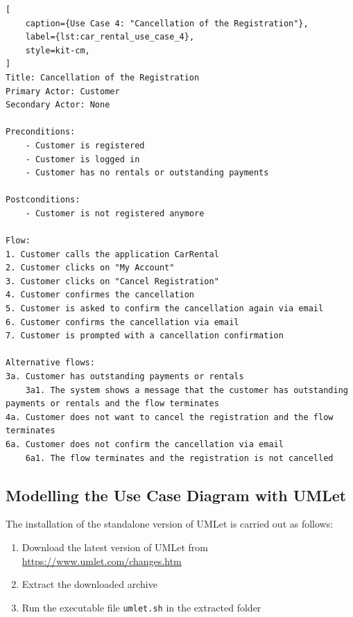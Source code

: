 \begin{lstlisting}[
    caption={Use Case 4: "Cancellation of the Registration"},
    label={lst:car_rental_use_case_4},
    style=kit-cm,
]
Title: Cancellation of the Registration
Primary Actor: Customer
Secondary Actor: None

Preconditions:
    - Customer is registered
    - Customer is logged in
    - Customer has no rentals or outstanding payments

Postconditions:
    - Customer is not registered anymore

Flow:
1. Customer calls the application CarRental
2. Customer clicks on "My Account"
3. Customer clicks on "Cancel Registration"
4. Customer confirmes the cancellation
5. Customer is asked to confirm the cancellation again via email
6. Customer confirms the cancellation via email
7. Customer is prompted with a cancellation confirmation

Alternative flows:
3a. Customer has outstanding payments or rentals
    3a1. The system shows a message that the customer has outstanding payments or rentals and the flow terminates
4a. Customer does not want to cancel the registration and the flow terminates
6a. Customer does not confirm the cancellation via email
    6a1. The flow terminates and the registration is not cancelled
\end{lstlisting}

\subsection*{Modelling the Use Case Diagram with UMLet}
The installation of the standalone version of UMLet is carried out as follows:
\begin{enumerate}
    \item Download the latest version of UMLet from \url{https://www.umlet.com/changes.htm}
    \item Extract the downloaded archive
    \item Run the executable file \texttt{umlet.sh} in the extracted folder
\end{enumerate}

